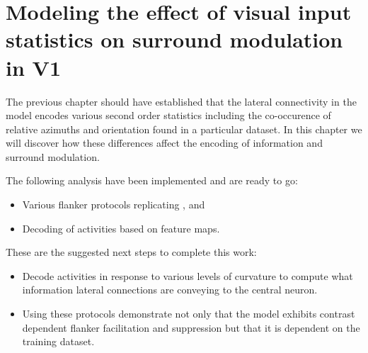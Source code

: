\chapter{Modeling the effect of visual input statistics on surround modulation in V1}

The previous chapter should have established that the lateral
connectivity in the model encodes various second order statistics
including the co-occurence of relative azimuths and orientation found
in a particular dataset. In this chapter we will discover how these
differences affect the encoding of information and surround
modulation.

The following analysis have been implemented and are ready to go:

\begin{itemize}
  \item Various flanker protocols replicating \cite{Kapadia1995}, \cite{Mizobe2001} and \cite{Polat1998}
  \item Decoding of activities based on feature maps.
\end{itemize}

These are the suggested next steps to complete this work:

\begin{itemize}
  \item Decode activities in response to various levels of curvature
    to compute what information lateral connections are conveying
    to the central neuron.
  \item Using these protocols demonstrate not only that the model
    exhibits contrast dependent flanker facilitation and suppression
    but that it is dependent on the training dataset.
\end{itemize}

